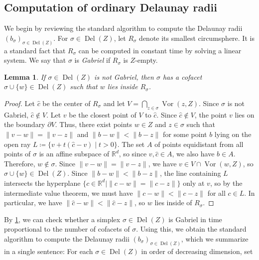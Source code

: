 \documentclass[11pt]{amsart}
\newcommand{\R}{\mathbb{R}} %
\DeclareMathOperator{\Vor}{Vor}
\DeclareMathOperator{\DelT}{Del}
\newcommand{\deff}{\emph}
\theoremstyle{plain}
\newtheorem{lemma}[theorem]{Lemma}
\theoremstyle{definition}
\theoremstyle{remark}
\begin{document}
\subsection{Computation of ordinary Delaunay radii}\label{Sec:Ordinary_Del_Radii}
We begin by reviewing the standard algorithm to compute the Delaunay radii $(b_{\sigma})_{\sigma\in \DelT(Z)}$.  For $\sigma \in \DelT(Z)$, let $R_{\sigma}$ denote its smallest circumsphere.  It is a standard fact that $R_{\sigma}$ can be computed in constant time by solving a linear system.  We say that $\sigma$ is \deff{Gabriel}  if $R_{\sigma}$ is $Z$-empty. %
\begin{lemma}\label{Lem:Cofacet_Radii}
If $\sigma \in \DelT(Z)$ is not Gabriel, then $\sigma$ has a cofacet $\sigma \cup \{w\} \in \DelT(Z)$ such that $w$ lies inside $R_{\sigma}$.
\end{lemma}
%
\begin{proof}
Let $\hat c$ be the center of $R_{\sigma}$ and let $V=\bigcap_{z\in \sigma} \Vor(z,Z)$.  Since $\sigma$ is not Gabriel, $\hat c \notin V$. Let $v$ be the closest point of $V$ to $\hat c$. Since $\hat c \notin V$, the point $v$ lies on the boundary $\partial V$.  Thus, there exist points $w \in Z$ and $z\in \sigma$ such that $\|v-w\|=\|v-z\|$ and $\|b-w\|<\|b-z\|$ for some point $b$ lying on the open ray $L\coloneqq \{v+t(\hat c-v)\mid t>0\}$.  The set $A$ of points equidistant from all points of $\sigma$ is an affine subspace of $\R^d$, so since $v,\hat c\in A$, we also have $b\in A$.  Therefore, $w\not\in\sigma$.  Since $\|v-w\|=\|v-z\|$, we have $v \in V\cap \Vor(w,Z)$, so $\sigma \cup \{w\} \in \DelT(Z)$.  Since $\|b-w\|< \|b-z\|$, the line containing $L$ intersects the hyperplane $\{c\in \R^d \mid \|c-w\|=\|c-z\|\}$ only at $v$, so by the intermediate value theorem, we must have  $\|c-w\|<\|c-z\|$ for all $c\in L$.  In particular, we have  $\|\hat c-w\|<\|\hat c-z\|$, so $w$ lies inside of $R_{\sigma}$.
\end{proof}
%
By \cref{Lem:Cofacet_Radii}, we can check whether a simplex $\sigma\in \DelT(Z)$ is Gabriel in time proportional to the number of cofacets of $\sigma$.  Using this, we obtain the standard algorithm to compute the Delaunay radii $(b_{\sigma})_{\sigma\in \DelT(Z)}$, which we summarize in a single sentence: For each $\sigma \in \DelT(Z)$ in order of decreasing dimension, set 
\end{document}

